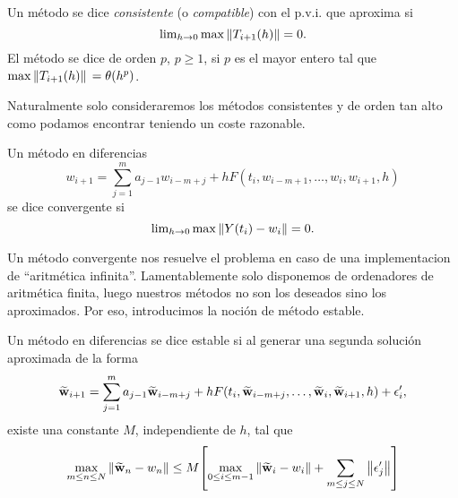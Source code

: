 \begin{definition}
    Un método se dice \emph{consistente} (o \emph{compatible})
    con el p.v.i. que aproxima si
    \begin{equation*}
        \lim\nolimits_{h\to 0} \max{\norm{T_{i+1}(h)}} = 0.
	\end{equation*}
	El método se dice de orden $p$, $p \geq 1$, si $p$ es el mayor entero
	tal que $\max{\norm*{T_{i+1}(h)}} = \theta(h^p)$.
\end{definition}

Naturalmente solo consideraremos los métodos consistentes y de orden tan
alto como podamos encontrar teniendo un coste razonable.

\begin{definition}
    Un método en diferencias
    \begin{equation*}
        w_{i+1} = \sum_{j=1}^m {a_{j-1}w_{i-m+j}}
            + hF(t_i,w_{i-m+1}, \dots, w_i,w_{i+1},h)
    \end{equation*}
    se dice convergente si
    \begin{equation*}
        \lim\nolimits_{h \to 0} \max{\norm{Y(t_i)-w_i}} = 0.
    \end{equation*}
\end{definition}

Un método convergente nos resuelve el problema en caso de una
implementacion de ``aritmética infinita''.
Lamentablemente solo disponemos de ordenadores de aritmética finita,
luego nuestros métodos no son los deseados sino los aproximados. %
Por eso, introducimos la noción de método estable.

\begin{definition}
    Un método en diferencias se dice estable
    si al generar una segunda solución aproximada de la forma
    \begin{equation*}
        \vb{\widetilde{w}}_{i+1} = \sum_{j=1}^m {a_{j-1}\vb{\widetilde{w}}_{i-m+j}}
            + h F(t_i,\vb{\widetilde{w}}_{i-m+j}, \dots, \vb{\widetilde{w}}_i,\vb{\widetilde{w}}_{i+1},h) + \epsilon'_i,
    \end{equation*}
    existe una constante $M$, independiente de $h$, tal que
    \begin{equation*} \label{stab}
        \max_{m \leq n \leq N}{\norm{\vb{\widetilde{w}}_n - w_n}} \leq M\qty[
            \max_{0 \leq i \le m-1}{\norm{\vb{\widetilde{w}}_i - w_i}}
            + \sum_{m \leq j \leq N} \norm{\epsilon'_j}
        ]
    \end{equation*}
\end{definition}

